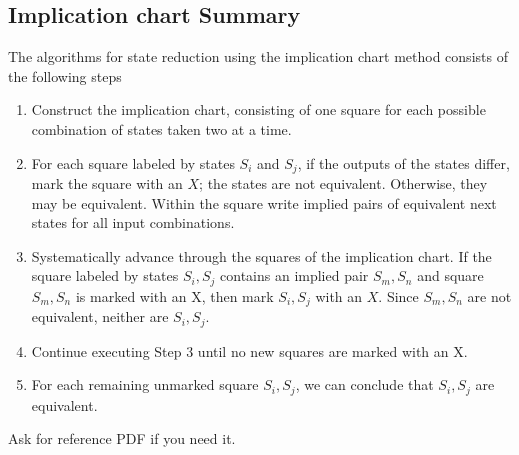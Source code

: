 \documentclass{article}
\begin{document}
\subsection{Implication chart Summary}
The algorithms for state reduction using the implication chart method consists
of the following steps
\begin{enumerate}
  \item Construct the implication chart, consisting of one square for each
    possible combination of states taken two at a time.
  \item For each square labeled by states $S_i$ and $S_j$, if the outputs of the
    states differ, mark the square with an $X$; the states are not equivalent.
    Otherwise, they may be equivalent. Within the square write implied pairs of
    equivalent next states for all input combinations.
  \item Systematically advance through the squares of the implication chart. If
    the square labeled by states $S_i, S_j$ contains an implied pair $S_m, S_n$
    and square $S_m, S_n$ is marked with an X, then mark $S_i, S_j$ with an $X$.
    Since $S_m, S_n$ are not equivalent, neither are $S_i, S_j$.
  \item Continue executing Step 3 until no new squares are marked with an X.
  \item For each remaining unmarked square $S_i, S_j$, we can conclude that
    $S_i, S_j$ are equivalent.
\end{enumerate}



Ask for reference PDF if you need it.

\end{document}
